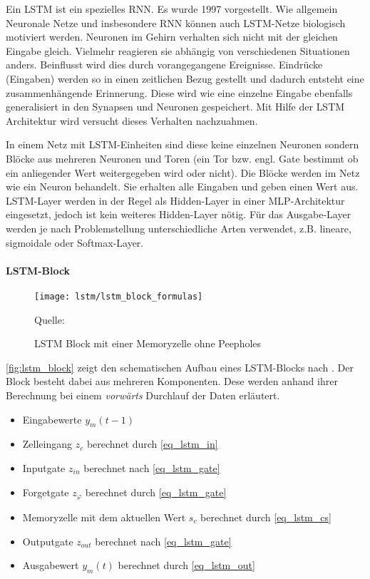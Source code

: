 Ein \acl{LSTM} ist ein spezielles \ac{RNN}. Es wurde 1997
vorgestellt\cite{Hochreiter:1997}. Wie allgemein Neuronale Netze und
insbesondere \ac{RNN} können auch \ac{LSTM}-Netze biologisch motiviert werden.
Neuronen im Gehirn verhalten sich nicht mit der gleichen Eingabe gleich.
Vielmehr reagieren sie abhängig von verschiedenen Situationen anders. Beinflusst
wird dies durch vorangegangene Ereignisse. Eindrücke (Eingaben) werden so in
einen zeitlichen Bezug gestellt und dadurch entsteht eine zusammenhängende
Erinnerung. Diese wird wie eine einzelne Eingabe ebenfalls generalisiert in den
Synapsen und Neuronen gespeichert. Mit Hilfe der \ac{LSTM} Architektur wird
versucht dieses Verhalten nachzuahmen. 

In einem Netz mit \ac{LSTM}-Einheiten sind diese keine einzelnen Neuronen
sondern Blöcke aus mehreren Neuronen und Toren (ein Tor bzw. engl.
Gate bestimmt ob ein anliegender Wert weitergegeben wird oder nicht).
Die Blöcke werden im Netz wie ein Neuron behandelt. Sie erhalten alle Eingaben
und geben einen Wert aus. \ac{LSTM}-Layer werden in der Regel als Hidden-Layer
in einer \ac{MLP}-Architektur eingesetzt, jedoch ist kein weiteres Hidden-Layer
nötig. Für das Ausgabe-Layer werden je nach Problemstellung unterschiedliche
Arten verwendet, z.B. lineare, sigmoidale oder Softmax-Layer.

\paragraph{\ac{LSTM}-Block}

\begin{figure*}[htfp]
	\begin{center}
	\texttt{[image: lstm/lstm\_block\_formulas]}
	\caption[\acs{LSTM} Block]{\acs{LSTM} Block mit einer Memoryzelle ohne
	Peepholes} \tiny Quelle: \cite{Gers2002b}
	\label{fig:lstm_block}
	\end{center}
\end{figure*}  

\autoref{fig:lstm_block} zeigt den schematischen Aufbau eines \ac{LSTM}-Blocks
nach \cite{Gers2002b}. Der Block besteht dabei aus mehreren Komponenten. Dese
werden anhand ihrer Berechnung bei einem \textit{vorwärts} Durchlauf der Daten
erläutert.
\begin{itemize}
	\item Eingabewerte $y_m(t-1)$
	\item Zelleingang $z_c$ berechnet durch \autoref{eq_lstm_in}
	\item Inputgate $z_{in}$ berechnet nach \autoref{eq_lstm_gate}
	\item Forgetgate $z_\varphi$ berechnet durch \autoref{eq_lstm_gate}
	\item Memoryzelle mit dem aktuellen Wert $s_c$ berechnet durch
	\autoref{eq_lstm_cs}
	\item Outputgate $z_{out}$ berechnet nach \autoref{eq_lstm_gate}
	\item Ausgabewert $y_m(t)$ berechnet durch \autoref{eq_lstm_out}
\end{itemize}

